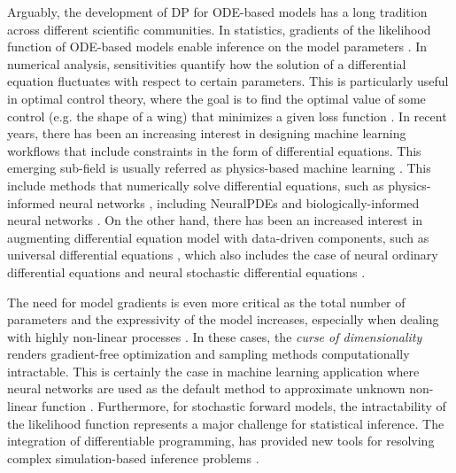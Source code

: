 Arguably, the development of DP for ODE-based models has a long tradition across different scientific communities.
In statistics, gradients of the likelihood function of ODE-based models enable inference on the model parameters \cite{ramsay2017dynamic}. 
In numerical analysis, sensitivities quantify how the solution of a differential equation fluctuates with respect to certain parameters. 
This is particularly useful in optimal control theory, where the goal is to find the optimal value of some control (e.g. the shape of a wing) that minimizes a given loss function \cite{Giles_Pierce_2000}. 
In recent years, there has been an increasing interest in designing machine learning workflows that include constraints in the form of differential equations.
This emerging sub-field is usually referred as physics-based machine learning \cite{Karniadakis_Kevrekidis_Lu_Perdikaris_Wang_Yang_2021, thuerey2021pbdl}.
This include methods that numerically solve differential equations, such as physics-informed neural networks \cite{PINNs_2019}, including NeuralPDEs \cite{Zubov_McCarthy_Ma_Calisto_Pagliarino_Azeglio_Bottero_Luján_Sulzer_Bharambe_et} and biologically-informed neural networks \cite{Lagergren_Nardini_Baker_Simpson_Flores_2020}. 
On the other hand, there has been an increased interest in augmenting differential equation model with data-driven components, such as universal differential equations \cite{rackauckas2020universal, Dandekar_2020}, which also includes the case of neural ordinary differential equations \cite{chen_neural_2019} and neural stochastic differential equations \cite{li2020scalable}.


The need for model gradients is even more critical as the total number of parameters and the expressivity of the model increases, especially when dealing with highly non-linear processes \cite{Karniadakis_Kevrekidis_Lu_Perdikaris_Wang_Yang_2021}.
In these cases, the \textit{curse of dimensionality} renders gradient-free optimization and sampling methods computationally intractable. 
This is certainly the case in machine learning application where neural networks are used as the default method to approximate unknown non-linear function \cite{LeCun2015}. 
Furthermore, for stochastic forward models, the intractability of the likelihood function represents a major challenge for statistical inference.
The integration of differentiable programming, has provided new tools for resolving complex simulation-based inference problems \cite{Cranmer_Brehmer_Louppe_2020}.


